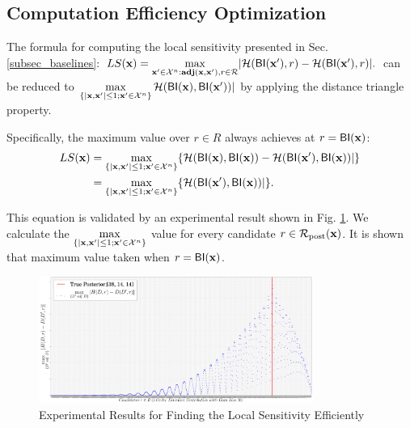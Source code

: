 \documentclass{article}
\begin{document}
\subsection{Computation Efficiency Optimization}
\label{subsec_effi}
The formula for computing the local sensitivity presented in Sec. \ref{subsec_baselines}: $LS(\textbf{x})=\max\limits_{\textbf{x}' \in \mathcal{X}^n:\textbf{adj}(\textbf{x},\textbf{x}'), r\in \mathcal{R}}\lvert \mathcal{H}(\mathsf{BI}(\textbf{x}'), r) - \mathcal{H}(\mathsf{BI}(\textbf{x}'), r)\rvert.$ 
can be reduced to $\max\limits_{\{|\textbf{x},\textbf{x}'| \leq 1; \textbf{x}'\in \mathcal{X}^n\}}\mathcal{H}(\mathsf{BI}(\textbf{x}), \mathsf{BI}(\textbf{x}'))|$
by applying the distance triangle property. 

Specifically, the maximum value over ${r \in R}$ always achieves at $r = \mathsf{BI}(\textbf{x})$:
\begin{equation*}
\begin{split}
LS(\textbf{x}) 
  & = \max\limits_{\{|\textbf{x},\textbf{x}'| \leq 1;\textbf{x}'\in \mathcal{X}^n\}} \{\mathcal{H}(\mathsf{BI}(\textbf{x}), \mathsf{BI}(\textbf{x})) - \mathcal{H}(\mathsf{BI}(\textbf{x}'), \mathsf{BI}(\textbf{x}))|\} \\
  & = \max\limits_{\{|\textbf{x},\textbf{x}'| \leq 1;\textbf{x}'\in \mathcal{X}^n\}} \{\mathcal{H}(\mathsf{BI}(\textbf{x}'), \mathsf{BI}(\textbf{x}))|\}.
\end{split}
\end{equation*}

This equation is validated by an experimental result shown in Fig. \ref{fig_efficiency}. We calculate the $\max\limits_{\{|\textbf{x},\textbf{x}'| \leq 1;\textbf{x}'\in \mathcal{X}^n\}}$ value for every candidate $r \in \mathcal{R}_{\textup{post}}(\textbf{x})$. It is shown that maximum value taken when  $r = \mathsf{BI}(\textbf{x})$.

\begin{figure}[ht]
\centering
\includegraphics[width=0.8\textwidth]{efficiency}
\caption{Experimental Results for Finding the Local Sensitivity Efficiently}
\label{fig_efficiency}
\end{figure}
\end{document}
